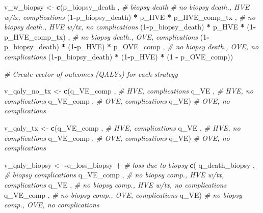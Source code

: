 \documentclass[
]{article}
\newenvironment{Shaded}{\begin{snugshade}}{\end{snugshade}}
\newcommand{\CommentTok}[1]{\textcolor[rgb]{0.56,0.35,0.01}{\textit{#1}}}
\newcommand{\DecValTok}[1]{\textcolor[rgb]{0.00,0.00,0.81}{#1}}
\newcommand{\KeywordTok}[1]{\textcolor[rgb]{0.13,0.29,0.53}{\textbf{#1}}}
\newcommand{\NormalTok}[1]{#1}
\newcommand{\OperatorTok}[1]{\textcolor[rgb]{0.81,0.36,0.00}{\textbf{#1}}}
\newcommand{\StringTok}[1]{\textcolor[rgb]{0.31,0.60,0.02}{#1}}
\begin{document}
\begin{Shaded}
\begin{Highlighting}[]
\NormalTok{  v_w_biopsy <-}\StringTok{ }\KeywordTok{c}\NormalTok{(p_biopsy_death                   ,   }\CommentTok{# biopsy death}
                 \CommentTok{# no biopsy death.,   HVE w/tx,       complications}
\NormalTok{                 (}\DecValTok{1}\OperatorTok{-}\NormalTok{p_biopsy_death)   }\OperatorTok{*}\StringTok{    }\NormalTok{p_HVE  }\OperatorTok{*}\StringTok{    }\NormalTok{p_HVE_comp_tx  ,  }
                 \CommentTok{# no biopsy death.,   HVE w/tx,     no complications}
\NormalTok{                 (}\DecValTok{1}\OperatorTok{-}\NormalTok{p_biopsy_death)   }\OperatorTok{*}\StringTok{    }\NormalTok{p_HVE  }\OperatorTok{*}\StringTok{ }\NormalTok{(}\DecValTok{1}\OperatorTok{-}\NormalTok{p_HVE_comp_tx) ,  }
                 \CommentTok{# no biopsy death.,        OVE,        complications}
\NormalTok{                 (}\DecValTok{1}\OperatorTok{-}\NormalTok{p_biopsy_death)   }\OperatorTok{*}\StringTok{ }\NormalTok{(}\DecValTok{1}\OperatorTok{-}\NormalTok{p_HVE) }\OperatorTok{*}\StringTok{      }\NormalTok{p_OVE_comp   ,  }
                 \CommentTok{# no biopsy death.,        OVE,     no complications}
\NormalTok{                 (}\DecValTok{1}\OperatorTok{-}\NormalTok{p_biopsy_death)   }\OperatorTok{*}\StringTok{ }\NormalTok{(}\DecValTok{1}\OperatorTok{-}\NormalTok{p_HVE) }\OperatorTok{*}\StringTok{ }\NormalTok{(}\DecValTok{1} \OperatorTok{-}\StringTok{ }\NormalTok{p_OVE_comp))      }
  
  \CommentTok{# Create vector of outcomes (QALYs) for each strategy }
  
\NormalTok{  v_qaly_no_tx  <-}\StringTok{ }\KeywordTok{c}\NormalTok{(q_VE_comp ,  }\CommentTok{# HVE, complications}
\NormalTok{                     q_VE      ,  }\CommentTok{# HVE, no complications}
\NormalTok{                     q_VE_comp ,  }\CommentTok{# OVE, complications}
\NormalTok{                     q_VE)        }\CommentTok{# OVE, no complications}
  
\NormalTok{  v_qaly_tx     <-}\StringTok{ }\KeywordTok{c}\NormalTok{(q_VE_comp ,  }\CommentTok{# HVE, complications}
\NormalTok{                     q_VE      ,  }\CommentTok{# HVE, no complications}
\NormalTok{                     q_VE_comp ,  }\CommentTok{# OVE, complications}
\NormalTok{                     q_VE)        }\CommentTok{# OVE, no complications}
  
  
\NormalTok{  v_qaly_biopsy <-}\StringTok{ }\OperatorTok{-}\NormalTok{q_loss_biopsy      }\OperatorTok{+}\StringTok{  }\CommentTok{# loss due to biopsy}
\StringTok{                    }\KeywordTok{c}\NormalTok{( q_death_biopsy  ,  }\CommentTok{# biopsy complications}
\NormalTok{                       q_VE_comp       ,  }\CommentTok{# no biopsy comp., HVE w/tx, complications }
\NormalTok{                       q_VE            ,  }\CommentTok{# no biopsy comp., HVE w/tx, no complications}
\NormalTok{                       q_VE_comp       ,  }\CommentTok{# no biopsy comp., OVE, complications}
\NormalTok{                       q_VE)              }\CommentTok{# no biopsy comp., OVE, no complications}
  

\end{Highlighting}
\end{Shaded}
\end{document}
